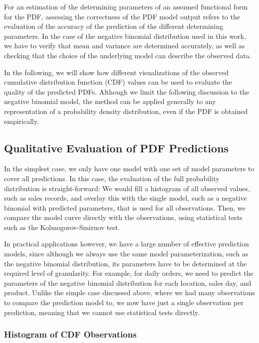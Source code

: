 \documentclass[BCOR=1mm, DIV=calc,10pt,
twoside=true,
twocolumn,
headings=normal]{scrartcl}
\begin{document}
For an estimation of the determining parameters of an assumed functional form for the PDF, assessing the correctness of the PDF model output refers to the evaluation of the accuracy of the prediction of the different determining parameters. In the case of the negative binomial distribution used in this work, we have to verify that mean and variance are determined accurately, as well as checking that the choice of the underlying model can describe the observed data.

In the following, we will show how different visualizations of the observed cumulative distribution function (CDF) values can be used to evaluate the quality of the predicted PDFs. Although we limit the following discussion to the negative binomial model, the method can be applied generally to any representation of a probability density distribution, even if the PDF is obtained empirically.

\subsection{Qualitative Evaluation of PDF Predictions}

In the simplest case, we only have one model with one set of model parameters to cover all predictions. In this case, the evaluation of the full probability distribution is straight-forward: We would fill a histogram of all observed values, such as sales records, and overlay this with the single model, such as a negative binomial with predicted parameters, that is used for all observations. Then, we compare the model curve directly with the observations, using statistical tests such as the Kolmogorov-Smirnov test.

In practical applications however, we have a large number of effective prediction models, since although we always use the same model parameterization, such as the negative binomial distribution, its parameters have to be determined at the required level of granularity. For example, for daily orders, we need to predict the parameters of the negative binomial distribution for each location, sales day, and product. Unlike the simple case discussed above, where we had many observations to compare the prediction model to, we now have just a single observation per prediction, meaning that we cannot use statistical tests directly.

\subsubsection{Histogram of CDF Observations}
\label{sec:cdf_histo}
\end{document}
